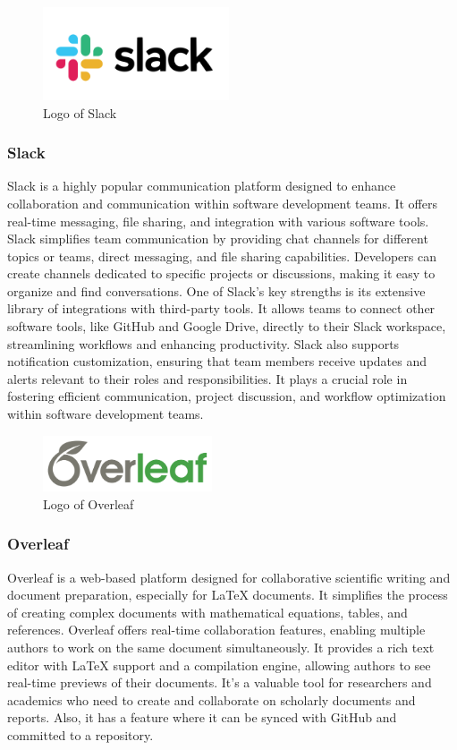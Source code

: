\documentclass[conference]{IEEEtran}
\begin{document}
        \begin{figure}[htbp]
        \centerline{\includegraphics[width=5.5cm]{Images/logo/slack.png}}
        \label{fig}
        \caption{Logo of Slack}
        \end{figure}
        \subsubsection{Slack}
        Slack is a highly popular communication platform designed to enhance collaboration and communication within software development teams. It offers real-time messaging, file sharing, and integration with various software tools. Slack simplifies team communication by providing chat channels for different topics or teams, direct messaging, and file sharing capabilities. Developers can create channels dedicated to specific projects or discussions, making it easy to organize and find conversations. One of Slack's key strengths is its extensive library of integrations with third-party tools. It allows teams to connect other software tools, like GitHub and Google Drive, directly to their Slack workspace, streamlining workflows and enhancing productivity. Slack also supports notification customization, ensuring that team members receive updates and alerts relevant to their roles and responsibilities. It plays a crucial role in fostering efficient communication, project discussion, and workflow optimization within software development teams.\\

        \begin{figure}[htbp]
        \centerline{\includegraphics[width=5cm]{Images/logo/overleaf.png}}
        \label{fig}
        \caption{Logo of Overleaf}
        \end{figure}
        \subsubsection{Overleaf}
        Overleaf is a web-based platform designed for collaborative scientific writing and document preparation, especially for LaTeX documents. It simplifies the process of creating complex documents with mathematical equations, tables, and references. Overleaf offers real-time collaboration features, enabling multiple authors to work on the same document simultaneously. It provides a rich text editor with LaTeX support and a compilation engine, allowing authors to see real-time previews of their documents. It's a valuable tool for researchers and academics who need to create and collaborate on scholarly documents and reports. Also, it has a feature where it can be synced with GitHub and committed to a repository.\\
\end{document}
